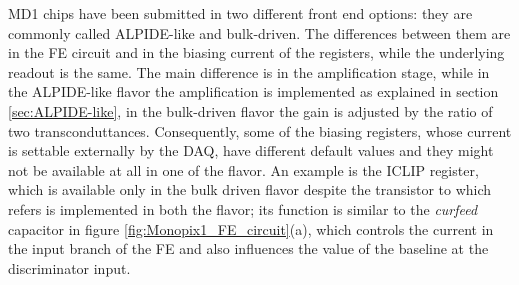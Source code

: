         MD1 chips have been submitted in two different front end options: they are commonly called ALPIDE-like and bulk-driven.  
        The differences between them are in the FE circuit and in the biasing current of the registers, while the underlying readout is the same.
        The main difference is in the amplification stage, while in the ALPIDE-like flavor the amplification is implemented as explained in section \ref{sec:ALPIDE-like}, in the bulk-driven flavor the gain is adjusted by the ratio of two transconduttances. Consequently, some of the biasing registers, whose current is settable externally by the DAQ, have different default values and they might not be available at all in one of the flavor.
        An example is the ICLIP register, which is available only in the bulk driven flavor despite the transistor to which refers is implemented in both the flavor; its function is similar to the \emph{curfeed} capacitor in figure \ref{fig:Monopix1_FE_circuit}(a), which controls the current in the input branch of the FE and also influences the value of the baseline at the discriminator input. 


